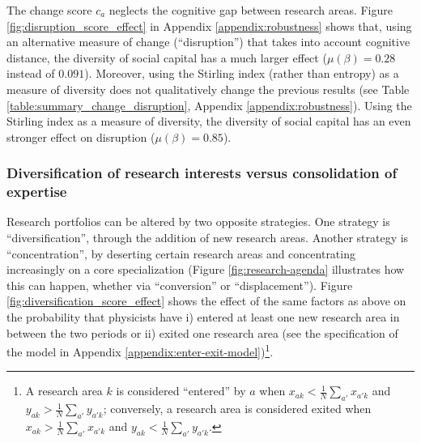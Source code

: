 \documentclass{article}
\begin{document}
The change score $c_a$ neglects the cognitive gap between research areas. Figure \ref{fig:disruption_score_effect} in Appendix \ref{appendix:robustness} shows that, using an alternative measure of change (``disruption'') that takes into account cognitive distance, the diversity of social capital has a much larger effect ($\mu(\beta)=0.28$ instead of $0.091$). Moreover, using the Stirling index (rather than entropy) as a measure of diversity does not qualitatively change the previous results (see Table \ref{table:summary_change_disruption}, Appendix \ref{appendix:robustness}). Using the Stirling index as a measure of diversity, the diversity of social capital has an even stronger effect on disruption ($\mu(\beta)=0.85$). 


\subsubsection{Diversification of research interests versus consolidation of expertise}

Research portfolios can be altered by two opposite strategies. One strategy is ``diversification'', through the addition of new research areas. Another strategy is ``concentration'', by deserting certain research areas and concentrating increasingly on a core specialization (Figure \ref{fig:research-agenda} illustrates how this can happen, whether via ``conversion'' or ``displacement''). Figure \ref{fig:diversification_score_effect} shows the effect of the same factors as above on the probability that physicists have i) entered at least one new research area in between the two periods or ii) exited one research area (see the specification of the model in Appendix \ref{appendix:enter-exit-model})\footnote{A research area $k$ is considered ``entered'' by $a$ when $x_{ak}<\frac{1}{N}\sum_{a'}x_{a'k}$ and $y_{ak}>\frac{1}{N}\sum_{a'}y_{a'k}$; conversely, a research area is considered exited when $x_{ak}>\frac{1}{N}\sum_{a'}x_{a'k}$ and $y_{ak}<\frac{1}{N}\sum_{a'}y_{a'k}$.}.
\end{document}
